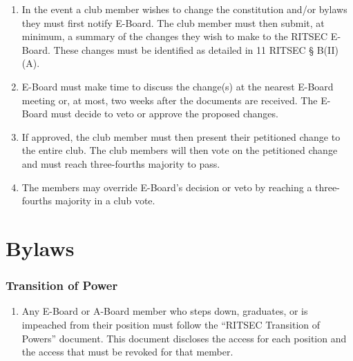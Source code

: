 \documentclass{article}
\begin{document}
\begin{enumerate}
  \item In the event a club member wishes to change the constitution and/or
    bylaws they must first notify E-Board. The club member must then submit, at
    minimum, a summary of the changes they wish to make to the RITSEC E-Board.
    These changes must be identified as detailed in 11 RITSEC § B(II)(A).
  \item E-Board must make time to discuss the change(s) at the nearest E-Board
    meeting or, at most, two weeks after the documents are received. The
    E-Board must decide to veto or approve the proposed changes.
  \item If approved, the club member must then present their petitioned change
    to the entire club. The club members will then vote on the petitioned
    change and must reach three-fourths majority to pass.
  \item The members may override E-Board's decision or veto by reaching a
    three-fourths majority in a club vote.
\end{enumerate}



\part{Bylaws}


\section{Transition of Power}

\begin{enumerate}
  \item Any E-Board or A-Board member who steps down, graduates, or is
    impeached from their position must follow the “RITSEC Transition of Powers”
    document. This document discloses the access for each position and the
    access that must be revoked for that member. 
\end{enumerate}

\end{document}

